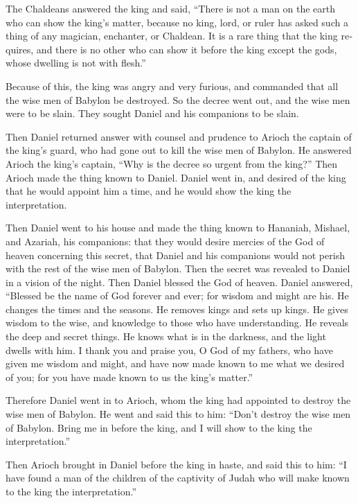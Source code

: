\begin{paracol}{2}
\begin{otherlanguage}{english}
 The Chaldeans answered the king and said, ``There is not
a man on the earth who can show the king's matter, because no king,
lord, or ruler has asked such a thing of any magician, enchanter, or
Chaldean.  It is a rare thing that the king requires, and
there is no other who can show it before the king except the gods, whose
dwelling is not with flesh.''

 Because of this, the king was angry and very furious,
and commanded that all the wise men of Babylon be destroyed.
 So the decree went out, and the wise men were to be
slain. They sought Daniel and his companions to be slain.

 Then Daniel returned answer with counsel and prudence to
Arioch the captain of the king's guard, who had gone out to kill the
wise men of Babylon.  He answered Arioch the king's
captain, ``Why is the decree so urgent from the king?'' Then Arioch made
the thing known to Daniel.  Daniel went in, and desired
of the king that he would appoint him a time, and he would show the king
the interpretation.

 Then Daniel went to his house and made the thing known
to Hananiah, Mishael, and Azariah, his companions:  that
they would desire mercies of the God of heaven concerning this secret,
that Daniel and his companions would not perish with the rest of the
wise men of Babylon.  Then the secret was revealed to
Daniel in a vision of the night. Then Daniel blessed the God of heaven.
 Daniel answered, ``Blessed be the name of God forever
and ever; for wisdom and might are his.  He changes the
times and the seasons. He removes kings and sets up kings. He gives
wisdom to the wise, and knowledge to those who have understanding.
 He reveals the deep and secret things. He knows what is
in the darkness, and the light dwells with him.  I thank
you and praise you, O God of my fathers, who have given me wisdom and
might, and have now made known to me what we desired of you; for you
have made known to us the king's matter.''

 Therefore Daniel went in to Arioch, whom the king had
appointed to destroy the wise men of Babylon. He went and said this to
him: ``Don't destroy the wise men of Babylon. Bring me in before the
king, and I will show to the king the interpretation.''

 Then Arioch brought in Daniel before the king in haste,
and said this to him: ``I have found a man of the children of the
captivity of Judah who will make known to the king the interpretation.''


\end{otherlanguage}
\end{paracol}

